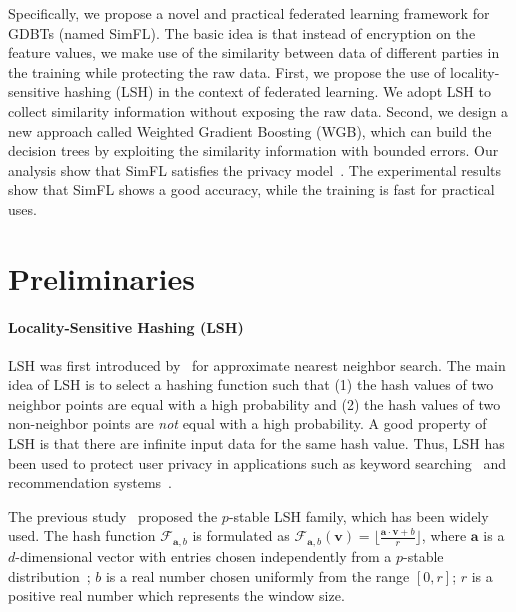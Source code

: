 \documentclass[letterpaper]{article} %
\theoremstyle{definition}
\newcommand{\citet}[1]{\citeauthor{#1} \shortcite{#1}}
\begin{document}
Specifically, we propose a novel and practical federated learning framework for GDBTs (named SimFL). The basic idea is that instead of encryption on the feature values, we make use of the similarity between data of different parties in the training while protecting the raw data. First, we propose the use of locality-sensitive hashing (LSH) in the context of federated learning. We adopt LSH to collect similarity information without exposing the raw data.  Second, we design a new approach called Weighted Gradient Boosting (WGB), which can build the decision trees by exploiting the similarity information with bounded errors. Our analysis show that SimFL satisfies the privacy model~\cite{du2004privacy,liu2018secure}. The experimental results show that SimFL shows a good accuracy, while the training is fast for practical uses. 

\section{Preliminaries}

\paragraph{Locality-Sensitive Hashing (LSH)}
LSH was first introduced by~\citet{gionis1999similarity} for approximate nearest neighbor search. The main idea of LSH is to select a hashing function such that (1) the hash values of two neighbor points are equal with a high probability and (2) the hash values of two non-neighbor points are \emph{not} equal with a high probability. A good property of LSH is that there are infinite input data for the same hash value. Thus, LSH has been used to protect user privacy in applications such as keyword searching~\cite{wang2014privacy} and recommendation systems~\cite{qi2017distributed}. 

The previous study~\cite{datar2004locality} proposed the $p$-stable LSH family, which has been widely used. The hash function $\mathcal{F}_{\mathbf{a},b}$ is formulated as $\mathcal{F}_{\mathbf{a},b}(\mathbf{v})=\lfloor\frac{\mathbf{a}\cdot\mathbf{v}+b}{r}\rfloor$, where $\mathbf{a}$ is a $d$-dimensional vector with entries chosen independently from a $p$-stable distribution~\cite{zolotarev1986one}; $b$ is a real number chosen uniformly from the range $[0,r]$; $r$ is a positive real number which represents the window size. 
\end{document}
